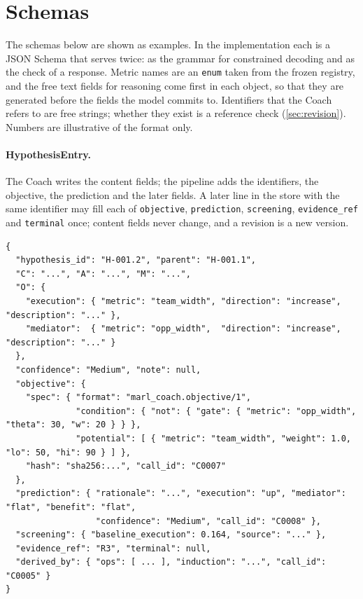 \documentclass[11pt]{article}
\newcommand{\code}[1]{\texttt{\small #1}}
\begin{document}
\clearpage



\clearpage
\appendix

\section{Schemas}
\label{app:schemas}

The schemas below are shown as examples.
In the implementation each is a JSON Schema that serves twice: as the grammar for constrained decoding and as the check of a response.
Metric names are an \code{enum} taken from the frozen registry, and the free text fields for reasoning come first in each object, so that they are generated before the fields the model commits to.
Identifiers that the Coach refers to are free strings; whether they exist is a reference check (\cref{sec:revision}).
Numbers are illustrative of the format only.

\paragraph{HypothesisEntry.}
The Coach writes the content fields; the pipeline adds the identifiers, the objective, the prediction and the later fields.
A later line in the store with the same identifier may fill each of \code{objective}, \code{prediction}, \code{screening}, \code{evidence\_ref} and \code{terminal} once; content fields never change, and a revision is a new version.
\begin{lstlisting}[style=json]
{
  "hypothesis_id": "H-001.2", "parent": "H-001.1",
  "C": "...", "A": "...", "M": "...",
  "O": {
    "execution": { "metric": "team_width", "direction": "increase", "description": "..." },
    "mediator":  { "metric": "opp_width",  "direction": "increase", "description": "..." }
  },
  "confidence": "Medium", "note": null,
  "objective": {
    "spec": { "format": "marl_coach.objective/1",
              "condition": { "not": { "gate": { "metric": "opp_width", "theta": 30, "w": 20 } } },
              "potential": [ { "metric": "team_width", "weight": 1.0, "lo": 50, "hi": 90 } ] },
    "hash": "sha256:...", "call_id": "C0007"
  },
  "prediction": { "rationale": "...", "execution": "up", "mediator": "flat", "benefit": "flat",
                  "confidence": "Medium", "call_id": "C0008" },
  "screening": { "baseline_execution": 0.164, "source": "..." },
  "evidence_ref": "R3", "terminal": null,
  "derived_by": { "ops": [ ... ], "induction": "...", "call_id": "C0005" }
}
\end{lstlisting}
\end{document}
